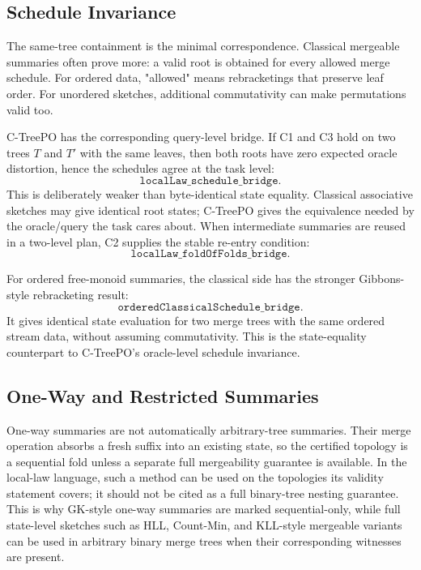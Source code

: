 \subsection{Schedule Invariance}

The same-tree containment is the minimal correspondence. Classical mergeable
summaries often prove more: a valid root is obtained for every allowed merge
schedule. For ordered data, "allowed" means rebracketings that preserve leaf
order. For unordered sketches, additional commutativity can make permutations
valid too.

C-TreePO has the corresponding query-level bridge. If C1 and C3 hold on two
trees \(T\) and \(T'\) with the same leaves, then both roots have zero
expected oracle distortion, hence the schedules agree at the task level:
\[
\texttt{localLaw\_schedule\_bridge}.
\]
This is deliberately weaker than byte-identical state equality. Classical
associative sketches may give identical root states; C-TreePO gives the
equivalence needed by the oracle/query the task cares about. When
intermediate summaries are reused in a two-level plan, C2 supplies the stable
re-entry condition:
\[
\texttt{localLaw\_foldOfFolds\_bridge}.
\]

For ordered free-monoid summaries, the classical side has the stronger
Gibbons-style rebracketing result:
\[
\texttt{orderedClassicalSchedule\_bridge}.
\]
It gives identical state evaluation for two merge trees with the same ordered
stream data, without assuming commutativity. This is the state-equality
counterpart to C-TreePO's oracle-level schedule invariance.

\subsection{One-Way and Restricted Summaries}

One-way summaries are not automatically arbitrary-tree summaries. Their merge
operation absorbs a fresh suffix into an existing state, so the certified
topology is a sequential fold unless a separate full mergeability guarantee is
available. In the local-law language, such a method can be used on the
topologies its validity statement covers; it should not be cited as a full
binary-tree nesting guarantee. This is why GK-style one-way summaries are marked
sequential-only, while full state-level sketches such as HLL, Count-Min, and
KLL-style mergeable variants can be used in arbitrary binary merge trees when
their corresponding witnesses are present.
